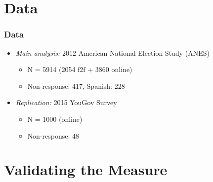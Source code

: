 \documentclass{beamer}
\begin{document}
\section{Data}

\begin{frame} %
\frametitle{Data}
	\begin{itemize}
	\item \emph{Main analysis:} 2012 American National Election Study (ANES)
		\begin{itemize}
		\item N = 5914 (2054 f2f + 3860 online)
		\item Non-response: 417, Spanish: 228
		\end{itemize}
		\vspace{1em}
	\item \emph{Replication:} 2015 YouGov Survey
		\begin{itemize}
		\item N = 1000 (online)
		\item Non-response: 48
		\end{itemize}
	\end{itemize}
\end{frame}


\section{Validating the Measure}
\end{document}

